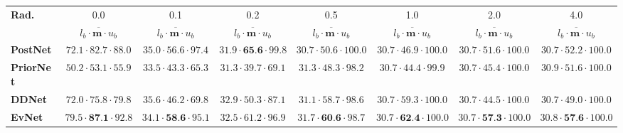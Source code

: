 \begin{tabular}{lccccccc}
\toprule
\textbf{Rad.} & 0.0 & 0.1 &  0.2 & 0.5 & 1.0 & 2.0 & 4.0 \\
                   & $\overline{l_b \cdot \mathrm{\textbf{m}} \cdot u_b}$ & $\overline{l_b \cdot \mathrm{\textbf{m}} \cdot u_b}$ & $\overline{l_b \cdot \mathrm{\textbf{m}} \cdot u_b}$ & $\overline{l_b \cdot \mathrm{\textbf{m}} \cdot u_b}$ & $\overline{l_b \cdot \mathrm{\textbf{m}} \cdot u_b}$ & $\overline{l_b \cdot \mathrm{\textbf{m}} \cdot u_b}$ & $\overline{l_b \cdot \mathrm{\textbf{m}} \cdot u_b}$ \\
\midrule
\textbf{PostNet } & $72.1 \cdot 82.7 \cdot 88.0$ &  $35.0 \cdot 56.6 \cdot 97.4$ &  $31.9 \cdot \textbf{65.6} \cdot 99.8$ & $30.7 \cdot 50.6 \cdot 100.0$ & $30.7 \cdot 46.9 \cdot 100.0$ &           $30.7 \cdot 51.6 \cdot 100.0$ &           $30.7 \cdot 52.2 \cdot 100.0$ \\
\textbf{PriorNet} & $50.2 \cdot 53.1 \cdot 55.9$ &  $33.5 \cdot 43.3 \cdot 65.3$ &  $31.3 \cdot 39.7 \cdot 69.1$ &  $31.3 \cdot 48.3 \cdot 98.2$ &  $30.7 \cdot 44.4 \cdot 99.9$ &           $30.7 \cdot 45.4 \cdot 100.0$ &            $30.9 \cdot 51.6 \cdot 100.0$ \\
\textbf{DDNet   } & $72.0 \cdot 75.8 \cdot 79.8$ &  $35.6 \cdot 46.2 \cdot 69.8$ &  $32.9 \cdot 50.3 \cdot 87.1$ &  $31.1 \cdot 58.7 \cdot 98.6$ &  $30.7 \cdot 59.3 \cdot 100.0$ &           $30.7 \cdot 44.5 \cdot 100.0$ &           $30.7 \cdot 49.0 \cdot 100.0$ \\
\textbf{EvNet   } &  $79.5 \cdot \textbf{87.1} \cdot 92.8$ &  $34.1 \cdot \textbf{58.6} \cdot 95.1$ & $32.5 \cdot 61.2 \cdot 96.9$ &  $31.7 \cdot \textbf{60.6} \cdot 98.7$ &  $30.7 \cdot \textbf{62.4} \cdot 100.0$ &           $30.7 \cdot \textbf{57.3} \cdot 100.0$ &           $30.8 \cdot \textbf{57.6} \cdot 100.0$ \\
\bottomrule
\end{tabular}